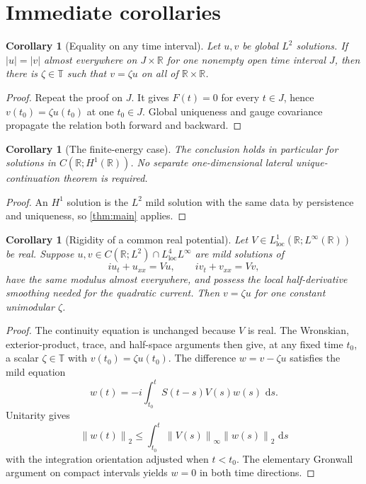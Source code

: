 \documentclass[11pt,oneside]{book}
\newtheorem{corollary}[theorem]{Corollary}
\theoremstyle{definition}
\theoremstyle{remark}
\newcommand{\R}{\mathbb R}
\newcommand{\T}{\mathbb T}
\newcommand{\1}{\mathbf 1}
\newcommand{\loc}{\mathrm{loc}}
\newcommand{\dd}{\,\mathrm d}
\newcommand{\norm}[1]{\left\lVert #1\right\rVert}
\begin{document}
\section{Immediate corollaries}

\begin{corollary}[Equality on any time interval]\label{cor:interval-version}
Let $u,v$ be global $L^2$ solutions.  If $|u|=|v|$ almost everywhere on
$J\times\R$ for one nonempty open time interval $J$, then there is
$\zeta\in\T$ such that $v=\zeta u$ on all of $\R\times\R$.
\end{corollary}

\begin{proof}
Repeat the proof on $J$.  It gives $F(t)=0$ for every $t\in J$, hence
$v(t_0)=\zeta u(t_0)$ at one $t_0\in J$.  Global uniqueness and gauge
covariance propagate the relation both forward and backward.
\end{proof}

\begin{corollary}[The finite-energy case]\label{cor:H1-case}
The conclusion holds in particular for solutions in $C(\R;H^1(\R))$.
No separate one-dimensional lateral unique-continuation theorem is required.
\end{corollary}

\begin{proof}
An $H^1$ solution is the $L^2$ mild solution with the same data by
persistence and uniqueness, so \cref{thm:main} applies.
\end{proof}

\begin{corollary}[Rigidity of a common real potential]\label{cor:linear-common-potential}
Let $V\in L^1_{\loc}(\R;L^\infty(\R))$ be real.  Suppose
$u,v\in C(\R;L^2)\cap L^4_{\loc}L^\infty$ are mild solutions of
\[
 iu_t+u_{xx}=Vu,
 \qquad iv_t+v_{xx}=Vv,
\]
have the same modulus almost everywhere, and possess the local
half-derivative smoothing needed for the quadratic current.  Then
$v=\zeta u$ for one constant unimodular $\zeta$.
\end{corollary}

\begin{proof}
The continuity equation is unchanged because $V$ is real.  The Wronskian,
exterior-product, trace, and half-space arguments then give, at any fixed
time $t_0$, a scalar $\zeta\in\T$ with $v(t_0)=\zeta u(t_0)$.  The difference
$w=v-\zeta u$ satisfies the mild equation
\[
 w(t)=-i\int_{t_0}^t S(t-s)V(s)w(s)\,\dd s.
\]
Unitarity gives
\[
 \norm{w(t)}_2
 \le\int_{t_0}^t\norm{V(s)}_\infty\norm{w(s)}_2\,\dd s
\]
with the integration orientation adjusted when $t<t_0$.  The elementary
Gronwall argument on compact intervals yields $w=0$ in both time directions.
\end{proof}
\end{document}
